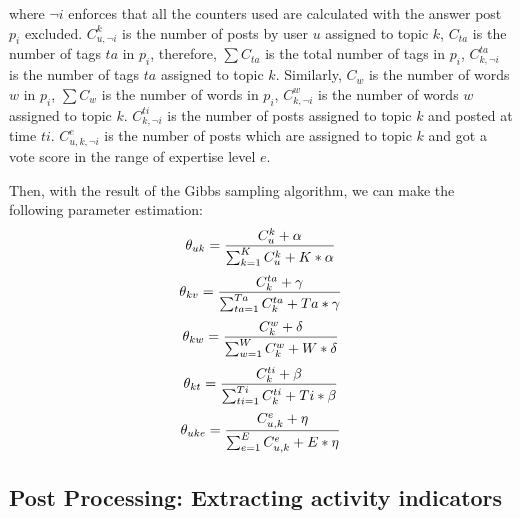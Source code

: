 {{{{{{{\noindent
where $\neg i$ enforces that all the counters used are calculated with the answer post $p_i$ excluded. $C_{u,\neg i}^k$ is the number of posts by user $u$ assigned to topic $k$, $C_{ta}$ is the number of tags $ta$ in $p_i$, therefore, $\sum C_{ta}$ is the total number of tags in $p_i$, $C_{k,\neg i}^{ta}$ is the number of tags $ta$ assigned to topic $k$. Similarly, $C_{w}$ is the number of words $w$ in $p_i$, $\sum C_{w}$ is the number of words in $p_i$, $C_{k,\neg i}^{w}$ is the number of words $w$ assigned to topic $k$. $C_{k,\neg i}^{ti}$ is the number of posts assigned to topic $k$ and posted at time $ti$. $C_{u,k,\neg i}^{e}$ is the number of posts which are assigned to topic $k$ and got a vote score in the range of expertise level $e$.

Then, with the result of the Gibbs sampling algorithm, we can make the following parameter estimation:
\begin{equation}\scriptsize
\theta_{uk}=\frac{ C_u^k + \alpha }{ \sum_{k=1}^K C_u^k+ K* \alpha} 
\label{eq:uk}
\end{equation}
\begin{equation}\scriptsize
\theta_{kv}=\frac{ C_k^{ta} + \gamma }{ \sum_{ta=1}^{Ta} C_k^{ta}+ Ta* \gamma}
\label{eq:kv}
\end{equation}
\begin{equation}\scriptsize
\theta_{kw}=\frac{ C_k^w + \delta }{ \sum_{w=1}^W C_k^w+ W* \delta}
\label{eq:kw}
\end{equation}
\begin{equation}\scriptsize
\theta_{kt}=\frac{ C_k^{ti} + \beta }{ \sum_{ti=1}^{Ti} C_k^{ti}+ Ti* \beta}
\label{eq:kt}
\end{equation}
\begin{equation}\scriptsize
\theta_{uke}=\frac{ C_{u,k}^e + \eta }{ \sum_{e=1}^E C_{u,k}^e+ E* \eta} 
\label{eq:uke}
\end{equation}


\subsection{Post Processing: Extracting activity indicators}\label{sec:detailed}

}}}}}}}
